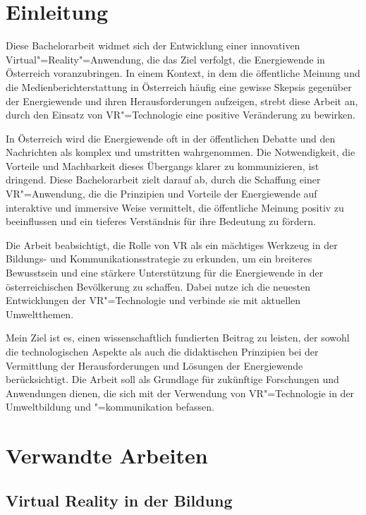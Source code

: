 \documentclass[draft]{vutinfth} %
\begin{document}
\tableofcontents %
\mainmatter

\chapter{Einleitung}
Diese Bachelorarbeit widmet sich der Entwicklung einer innovativen Virtual"=Reality"=Anwendung, die das Ziel verfolgt, die Energiewende in Österreich voranzubringen. In einem Kontext, in dem die öffentliche Meinung und die Medienberichterstattung in Österreich häufig eine gewisse Skepsis gegenüber der Energiewende und ihren Herausforderungen aufzeigen, strebt diese Arbeit an, durch den Einsatz von VR"=Technologie eine positive Veränderung zu bewirken.

In Österreich wird die Energiewende oft in der öffentlichen Debatte und den Nachrichten als komplex und umstritten wahrgenommen. Die Notwendigkeit, die Vorteile und Machbarkeit dieses Übergangs klarer zu kommunizieren, ist dringend. Diese Bachelorarbeit zielt darauf ab, durch die Schaffung einer VR"=Anwendung, die die Prinzipien und Vorteile der Energiewende auf interaktive und immersive Weise vermittelt, die öffentliche Meinung positiv zu beeinflussen und ein tieferes Verständnis für ihre Bedeutung zu fördern.

Die Arbeit beabsichtigt, die Rolle von VR als ein mächtiges Werkzeug in der Bildungs- und Kommunikationsstrategie zu erkunden, um ein breiteres Bewusstsein und eine stärkere Unterstützung für die Energiewende in der österreichischen Bevölkerung zu schaffen.
Dabei nutze ich die neuesten Entwicklungen der VR"=Technologie und verbinde sie mit aktuellen Umweltthemen.

Mein Ziel ist es, einen wissenschaftlich fundierten Beitrag zu leisten, der sowohl die technologischen Aspekte als auch die didaktischen Prinzipien bei der Vermittlung der Herausforderungen und Lösungen der Energiewende berücksichtigt. Die Arbeit soll als Grundlage für zukünftige Forschungen und Anwendungen dienen, die sich mit der Verwendung von VR"=Technologie in der Umweltbildung und "=kommunikation befassen.

\chapter{Verwandte Arbeiten}

\section{Virtual Reality in der Bildung}
\end{document}
